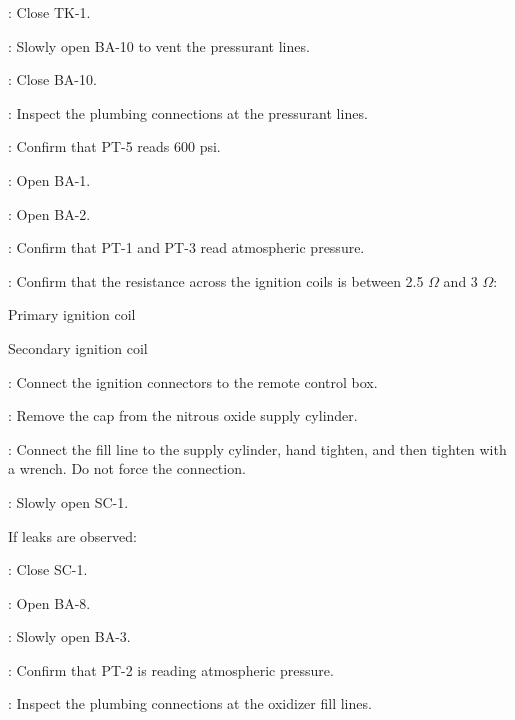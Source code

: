 \begin{checklist}
\begin{checklist}[label=$\bullet$]
        \begin{checklist}
            \item \primary{}: Close TK-1.
            \item \primary{}: Slowly open BA-10 to vent the pressurant lines.
            \item \primary{}: Close BA-10.
            \item \primary{}: Inspect the plumbing connections at the pressurant lines.
        \end{checklist}
    \end{checklist}
    \item \daq{}: Confirm that PT-5 reads 600 psi.
	\item \primary{}: Open BA-1.
	\item \primary{}: Open BA-2.
	\item \daq{}: Confirm that PT-1 and PT-3 read atmospheric pressure.
    \item \secondary{}: Confirm that the resistance across the ignition coils is between 2.5 $\Omega$ and 3 $\Omega$:
    \begin{checklist}
            \item Primary ignition coil
            \item Secondary ignition coil
    \end{checklist}
    \item \secondary{}: Connect the ignition connectors to the remote control box.
    \item \primary{}: Remove the cap from the nitrous oxide supply cylinder.
    \item \primary{}: Connect the fill line to the supply cylinder, hand tighten, and then tighten with a wrench. Do not force the connection.
    \item \primary{}: Slowly open SC-1.
    \begin{checklist}[label=$\bullet$]
        \item If leaks are observed:
        \begin{checklist}
            \item \primary{}: Close SC-1.
            \item \primary{}: Open BA-8.
            \item \primary{}: Slowly open BA-3.
            \item \daq{}: Confirm that PT-2 is reading atmospheric pressure.
            \item \primary{}: Inspect the plumbing connections at the oxidizer fill lines.

\end{checklist}
\end{checklist}
\end{checklist}
